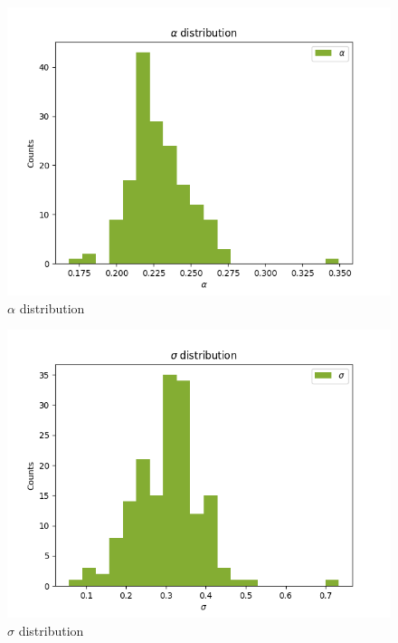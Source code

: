 \documentclass[
]{article}
\begin{document}
\begin{figure}
\centering
\includegraphics{pngplots/param2.png}
\caption{\(\alpha\) distribution}
\end{figure}

\begin{figure}
\centering
\includegraphics{pngplots/param3.png}
\caption{\(\sigma\) distribution}
\end{figure}
\end{document}
